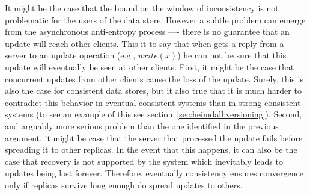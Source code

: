 It might be the case that the bound on the  window of inconsistency is not problematic for the users of the  data store. 
However a subtle problem can emerge from the asynchronous anti-entropy process ---- there is no guarantee that an update will reach other clients. 
This it to say that when gets a reply from a server to an update operation (e.g., $write(x)$)  he can not be sure that this update will eventually be seen at other clients. 
First, it might be the case that concurrent updates from other clients cause the loss of the update. 
Surely, this is also the case for consistent data stores, but it also true that it is much harder to contradict this behavior in eventual consistent systems than in strong consistent systems (to see an example of this see section~\ref{sec:heimdall:versioning}). 
Second, and arguably more serious problem than the one identified in the previous argument, it might be case that the server that processed the update fails before spreading it to other replicas. 
In the event that this happens, it can also be the case that recovery is not supported by the system which inevitably leads to updates being lost forever. 
Therefore, eventually consistency ensures convergence only if replicas survive long enough do spread updates to others. 


